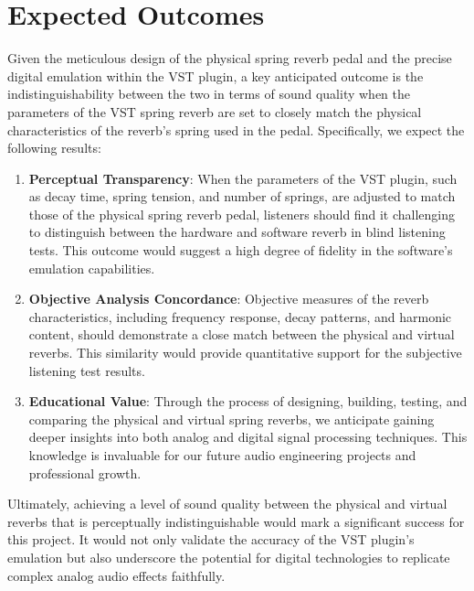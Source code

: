 \documentclass[12pt]{article}
\begin{document}
\newpage
\section{Expected Outcomes}
Given the meticulous design of the physical spring reverb pedal and the precise digital emulation within the VST plugin, a key anticipated outcome is the indistinguishability between the two in terms of sound quality when the parameters of the VST spring reverb are set to closely match the physical characteristics of the reverb's spring used in the pedal. Specifically, we expect the following results:

\begin{enumerate}
    \item \textbf{Perceptual Transparency}: When the parameters of the VST plugin, such as decay time, spring tension, and number of springs, are adjusted to match those of the physical spring reverb pedal, listeners should find it challenging to distinguish between the hardware and software reverb in blind listening tests. This outcome would suggest a high degree of fidelity in the software's emulation capabilities.
    
    \item \textbf{Objective Analysis Concordance}: Objective measures of the reverb characteristics, including frequency response, decay patterns, and harmonic content, should demonstrate a close match between the physical and virtual reverbs. This similarity would provide quantitative support for the subjective listening test results.
    
    \item \textbf{Educational Value}: Through the process of designing, building, testing, and comparing the physical and virtual spring reverbs, we anticipate gaining deeper insights into both analog and digital signal processing techniques. This knowledge is invaluable for our future audio engineering projects and professional growth.
\end{enumerate}

Ultimately, achieving a level of sound quality between the physical and virtual reverbs that is perceptually indistinguishable would mark a significant success for this project. It would not only validate the accuracy of the VST plugin's emulation but also underscore the potential for digital technologies to replicate complex analog audio effects faithfully.
\end{document}

